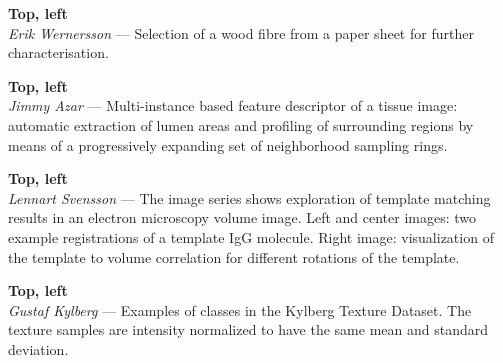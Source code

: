 \documentclass[11pt,twoside,a4paper,titlepage]{article}
\begin{document}
\noindent
{\bf Top, left}\\
\emph{Erik Wernersson} --- Selection of a wood fibre from a paper sheet for further characterisation. 

\vspace*{1cm}

\noindent
{\bf Top, left}\\
\emph{Jimmy Azar} --- Multi-instance based feature descriptor of a tissue image: automatic extraction of lumen areas and profiling of surrounding regions by means of a progressively expanding set of neighborhood sampling rings.

\vspace*{1cm}

\noindent
{\bf Top, left}\\
\emph{Lennart Svensson} --- The image series shows exploration of template matching results in an electron microscopy volume image. Left and center images: two example registrations of a template IgG molecule. Right image: visualization of the template to volume correlation for different rotations of the template.

\vspace*{1cm}

\noindent
{\bf Top, left}\\
\emph{Gustaf Kylberg} --- 
Examples of classes in the Kylberg Texture Dataset. The texture samples are intensity normalized to have the same mean and standard deviation.

\vspace*{1cm}

%
%
%
%
%
%
\end{document}
